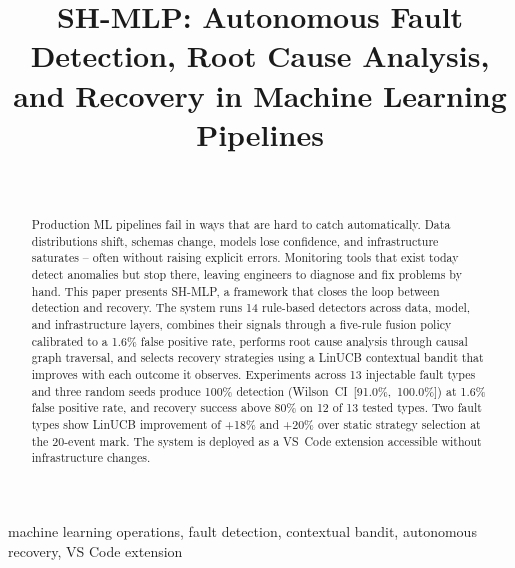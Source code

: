 \documentclass[conference]{IEEEtran}
\begin{document}
\title{SH-MLP: Autonomous Fault Detection, Root Cause Analysis,
       and Recovery in Machine Learning Pipelines}

\author{%
  \begin{tabular}{cccc}
    \IEEEauthorblockN{} & \IEEEauthorblockN{} &
    \IEEEauthorblockN{} & \IEEEauthorblockN{} \\[2pt]
    \IEEEauthorblockA{} & \IEEEauthorblockA{} &
    \IEEEauthorblockA{} & \IEEEauthorblockA{}
  \end{tabular}
}

\maketitle

\begin{abstract}
Production ML pipelines fail in ways that are hard to catch automatically.
Data distributions shift, schemas change, models lose confidence, and
infrastructure saturates -- often without raising explicit errors. Monitoring
tools that exist today detect anomalies but stop there, leaving engineers to
diagnose and fix problems by hand. This paper presents SH-MLP, a framework
that closes the loop between detection and recovery. The system runs 14
rule-based detectors across data, model, and infrastructure layers, combines
their signals through a five-rule fusion policy calibrated to a 1.6\% false
positive rate, performs root cause analysis through causal graph traversal,
and selects recovery strategies using a LinUCB contextual bandit that improves
with each outcome it observes. Experiments across 13 injectable fault types and
three random seeds produce 100\% detection (Wilson~CI~[91.0\%,~100.0\%]) at
1.6\% false positive rate, and recovery success above 80\% on 12 of 13 tested
types. Two fault types show LinUCB improvement of +18\% and +20\% over static
strategy selection at the 20-event mark. The system is deployed as a VS~Code
extension accessible without infrastructure changes.
\end{abstract}

\begin{IEEEkeywords}
machine learning operations, fault detection, contextual bandit,
autonomous recovery, VS Code extension
\end{IEEEkeywords}
\end{document}
